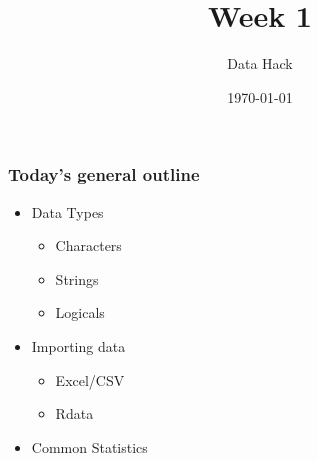 \documentclass[notes=show]{beamer}
\title[Data Hack 2022]{Week 1}
\date{\today}
\author[Camilo Abbate, Michael Topper]{Data Hack}
\institute[UCSB]{Spring 2022}
\begin{document}
\frame{\titlepage}



\section{}
\begin{frame}[c] \frametitle{Today's general outline}
	
\begin{itemize}[<+->]
\item Data Types
\begin{itemize}[<+->]
     \item Characters
     \item Strings
		 \item Logicals
     \end{itemize}
		
\item Importing data
\begin{itemize}[<+->]
     \item Excel/CSV
     \item Rdata
		 \end{itemize}

\item Common Statistics
	
\end{itemize}
	
\end{frame}
\end{document}
